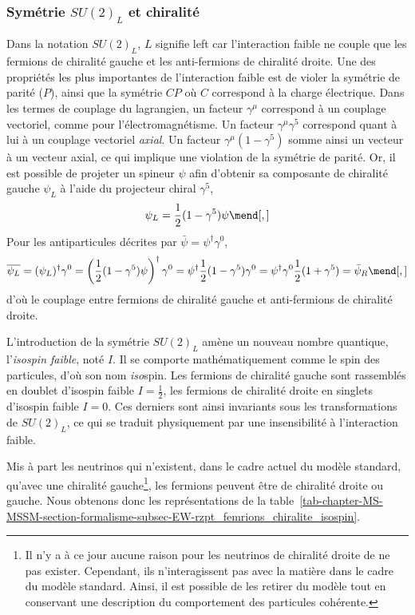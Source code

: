 \subsubsection{Symétrie $SU(2)_L$ et chiralité}\label{chapter-MS-MSSM-section-formalisme-subsec-EW-SU2_L}
Dans la notation $SU(2)_L$, $L$ signifie \og left \fg{} car l'interaction faible ne couple que les fermions de chiralité gauche et les anti-fermions de chiralité droite.
Une des propriétés les plus importantes de l'interaction faible est de violer la symétrie de parité ($P$), ainsi que la symétrie $CP$ où $C$ correspond à la charge électrique.
Dans les termes de couplage du lagrangien, un facteur $\gamma^\mu$ correspond à un couplage vectoriel, comme pour l'électromagnétisme. Un facteur $\gamma^\mu \gamma^5$ correspond quant à lui à un couplage vectoriel \emph{axial}. Un facteur $\gamma^\mu (1-\gamma^5)$ somme ainsi un vecteur à un vecteur axial, ce qui implique une violation de la symétrie de parité.
Or, il est possible de projeter un spineur $\psi$ afin d'obtenir sa composante de chiralité gauche $\psi_L$ à l'aide du projecteur chiral $\gamma^5$,
\begin{equation}
\psi_L = \frac{1}{2}(1-\gamma^5)\psi
\mend[,]
\label{eq-projo_L}
\end{equation}
Pour les antiparticules décrites par $\bar{\psi}=\psi^\dagger \gamma^0$,
\begin{equation}
\overline{\psi_L}
= (\psi_L)^\dagger \gamma^0
= \left(\frac{1}{2}(1-\gamma^5)\psi\right)^\dagger\gamma^0
= \psi^\dagger \frac{1}{2} (1-\gamma^5) \gamma^0
= \psi^\dagger \gamma^0 \frac{1}{2} (1+\gamma^5)
= \bar{\psi}_R
\mend[,]
\label{eq-projo_R}
\end{equation}
d'où le couplage entre fermions de chiralité gauche et anti-fermions de chiralité droite.
\par L'introduction de la symétrie $SU(2)_L$ amène un nouveau nombre quantique, l'\emph{isospin faible}, noté $I$. Il se comporte mathématiquement comme le spin des particules, d'où son nom \emph{iso}spin.
Les fermions de chiralité gauche sont rassemblés en doublet d'isospin faible $I=\frac{1}{2}$, les fermions de chiralité droite en singlets d'isospin faible $I=0$. Ces derniers sont ainsi invariants sous les transformations de $SU(2)_L$, ce qui se traduit physiquement par une insensibilité à l'interaction faible.
\par Mis à part les neutrinos qui n'existent, dans le cadre actuel du modèle standard, qu'avec une chiralité gauche\footnote{Il n'y a à ce jour aucune raison pour les neutrinos de chiralité droite de ne pas exister. Cependant, ils n'interagissent pas avec la matière dans le cadre du modèle standard. Ainsi, il est possible de les retirer du modèle tout en conservant une description du comportement des particules cohérente.}, les fermions peuvent être de chiralité droite ou gauche. Nous obtenons donc les représentations de la table~\ref{tab-chapter-MS-MSSM-section-formalisme-subsec-EW-rzpt_femrions_chiralite_isospin}.
